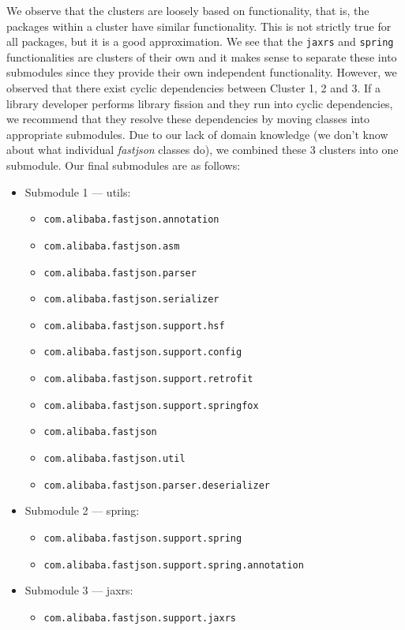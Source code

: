 We observe that the clusters are loosely based on functionality, that is, the packages within a cluster have similar functionality. This is not strictly true for all packages, but it is a good approximation. We see that the \texttt{jaxrs} and \texttt{spring} functionalities are clusters of their own and it makes sense to separate these into submodules since they provide their own independent functionality. However, we observed that there exist cyclic dependencies between Cluster 1, 2 and 3. If a library developer performs library fission and they run into cyclic dependencies, we recommend that they resolve these dependencies by moving classes into appropriate submodules. Due to our lack of domain knowledge (we don't know about what individual \emph{fastjson} classes do), we combined these 3 clusters into one submodule. Our final submodules are as follows:
\begin{itemize}
\item Submodule 1 --- utils:
\begin{itemize}
\item \texttt{com.alibaba.fastjson.annotation}
\item \texttt{com.alibaba.fastjson.asm}
\item \texttt{com.alibaba.fastjson.parser}
\item \texttt{com.alibaba.fastjson.serializer}
\item \texttt{com.alibaba.fastjson.support.hsf}
\item \texttt{com.alibaba.fastjson.support.config}
\item \texttt{com.alibaba.fastjson.support.retrofit}
\item \texttt{com.alibaba.fastjson.support.springfox}
\item \texttt{com.alibaba.fastjson}
\item \texttt{com.alibaba.fastjson.util}
\item \texttt{com.alibaba.fastjson.parser.deserializer}
\end{itemize}
\item Submodule 2 --- spring:
\begin{itemize}
\item \texttt{com.alibaba.fastjson.support.spring}
\item \texttt{com.alibaba.fastjson.support.spring.annotation}
\end{itemize}
\item Submodule 3 --- jaxrs:
\begin{itemize}
\item \texttt{com.alibaba.fastjson.support.jaxrs}
\end{itemize}
\end{itemize}

